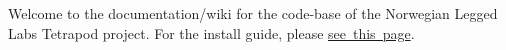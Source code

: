 Welcome to the documentation/wiki for the code-\/base of the Norwegian Legged Lab\textquotesingle{}s Tetrapod project. For the install guide, please \mbox{\hyperlink{md_docs_markdown_install_guide}{see this page}}. 
